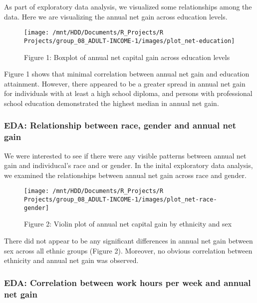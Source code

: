 \documentclass[]{article}
\begin{document}
As part of exploratory data analysis, we visualized some relationships
among the data. Here we are visualizing the annual net gain across
education levels.

\begin{figure}

{\centering \texttt{[image: /mnt/HDD/Documents/R\_Projects/R Projects/group\_08\_ADULT-INCOME-1/images/plot\_net-education]} 

}

\caption{Figure 1: Boxplot of annual net capital gain across education levels}\label{fig:net-gain-education}
\end{figure}

Figure 1 shows that minimal correlation between annual net gain and
education attainment. However, there appeared to be a greater spread in
annual net gain for individuals with at least a high school diploma, and
persons with professional school education demonstrated the highest
median in annual net gain.

\hypertarget{eda-relationship-between-race-gender-and-annual-net-gain}{%
\subsubsection{EDA: Relationship between race, gender and annual net
gain}\label{eda-relationship-between-race-gender-and-annual-net-gain}}

We were interested to see if there were any visible patterns between
annual net gain and individucal's race and or gender. In the inital
exploratory data analysis, we examined the relationships between annual
net gain across race and gender.

\begin{figure}

{\centering \texttt{[image: /mnt/HDD/Documents/R\_Projects/R Projects/group\_08\_ADULT-INCOME-1/images/plot\_net-race-gender]} 

}

\caption{Figure 2: Violin plot of annual net capital gain by ethnicity and sex}\label{fig:net-race-gender}
\end{figure}

There did not appear to be any significant differences in annual net
gain between sex across all ethnic groups (Figure 2). Moreover, no
obvious correlation between ethnicity and annual net gain was observed.

\hypertarget{eda-correlation-between-work-hours-per-week-and-annual-net-gain}{%
\subsubsection{EDA: Correlation between work hours per week and annual
net
gain}\label{eda-correlation-between-work-hours-per-week-and-annual-net-gain}}
\end{document}
